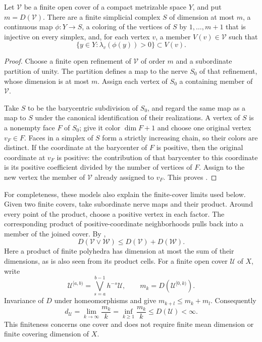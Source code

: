 \begin{lemma}
\label{lem:colored-subordinate-nerve}
Let $\mathcal V$ be a finite open cover of a compact metrizable
space $Y$, and put $m=D(\mathcal V)$.  There are a finite simplicial
complex $S$ of dimension at most $m$, a continuous map
$\phi:Y\to S$, a coloring of the vertices of $S$ by
$1,\ldots,m+1$ that is injective on every simplex, and, for each
vertex $v$, a member $V(v)\in\mathcal V$ such that
\begin{equation}
\label{eq:vertex-subordination}
 \{y\in Y:\lambda_v(\phi(y))>0\}\subset V(v).
\end{equation}
\end{lemma}

\begin{proof}
Choose a finite open refinement of $\mathcal V$ of order $m$ and
a subordinate partition of unity.  The partition defines a map
to the nerve $S_0$ of that refinement, whose dimension is at most
$m$.  Assign each vertex of $S_0$ a containing member of
$\mathcal V$.

Take $S$ to be the barycentric subdivision of $S_0$, and regard
the same map as a map to $S$ under the canonical identification
of their realizations.  A vertex of $S$ is a nonempty face $F$ of
$S_0$; give it color $\dim F+1$ and choose one original vertex
$v_F\in F$.  Faces in a simplex of $S$ form a strictly increasing
chain, so their colors are distinct.  If the coordinate at the
barycenter of $F$ is positive, then the original coordinate at
$v_F$ is positive: the contribution of that barycenter to this
coordinate is its positive coefficient divided by the number of
vertices of $F$.  Assign to the new vertex the member of
$\mathcal V$ already assigned to $v_F$.  This proves
.
\end{proof}

For completeness, these models also explain the finite-cover
limits used below.  Given two finite covers, take subordinate
nerve maps and their product.  Around every point of the product,
choose a positive vertex in each factor.  The corresponding product
of positive-coordinate neighborhoods pulls back into a member of
the joined cover.  By ,
\begin{equation}
\label{eq:cover-subadditivity}
 D(\mathcal V\vee\mathcal W)
 \le D(\mathcal V)+D(\mathcal W).
\end{equation}
Here a product of finite polyhedra has dimension at most the sum
of their dimensions, as is also seen from its product cells.
For a finite open cover $\mathcal U$ of $X$, write
\[
 \mathcal U^{[a,b)}=\bigvee_{s=a}^{b-1}h^{-s}\mathcal U,
 \qquad m_k=D(\mathcal U^{[0,k)}).
\]
Invariance of $D$ under homeomorphisms and
 give $m_{k+l}\le m_k+m_l$.
Consequently
\begin{equation}
\label{eq:finite-cover-rate}
 d_{\mathcal U}
   =\lim_{k\to\infty}\frac{m_k}{k}
   =\inf_{k\ge1}\frac{m_k}{k}
   \le D(\mathcal U)<\infty.
\end{equation}
This finiteness concerns one cover and does not require finite
mean dimension or finite covering dimension of $X$.

